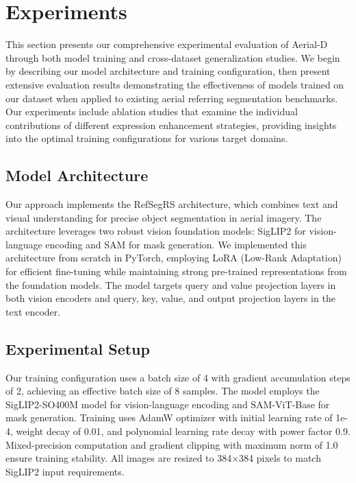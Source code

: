 
\section{Experiments}
\label{sec:experiments}

This section presents our comprehensive experimental evaluation of Aerial-D through both model training and cross-dataset generalization studies. We begin by describing our model architecture and training configuration, then present extensive evaluation results demonstrating the effectiveness of models trained on our dataset when applied to existing aerial referring segmentation benchmarks. Our experiments include ablation studies that examine the individual contributions of different expression enhancement strategies, providing insights into the optimal training configurations for various target domains.

\subsection{Model Architecture}
\label{subsec:model_architecture}

Our approach implements the RefSegRS architecture, which combines text and visual understanding for precise object segmentation in aerial imagery. The architecture leverages two robust vision foundation models: SigLIP2 for vision-language encoding and SAM for mask generation. We implemented this architecture from scratch in PyTorch, employing LoRA (Low-Rank Adaptation) for efficient fine-tuning while maintaining strong pre-trained representations from the foundation models. The model targets query and value projection layers in both vision encoders and query, key, value, and output projection layers in the text encoder.

\subsection{Experimental Setup}
\label{subsec:experimental_setup}

Our training configuration uses a batch size of 4 with gradient accumulation steps of 2, achieving an effective batch size of 8 samples. The model employs the SigLIP2-SO400M model for vision-language encoding and SAM-ViT-Base for mask generation. Training uses AdamW optimizer with initial learning rate of 1e-4, weight decay of 0.01, and polynomial learning rate decay with power factor 0.9. Mixed-precision computation and gradient clipping with maximum norm of 1.0 ensure training stability. All images are resized to 384×384 pixels to match SigLIP2 input requirements.

